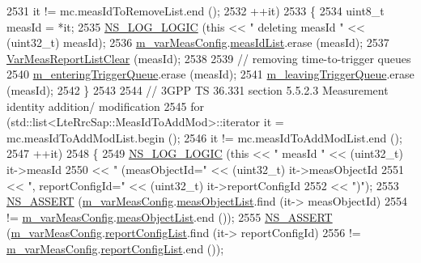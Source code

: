 \begin{DoxyCode}
2531        it !=  mc.measIdToRemoveList.end ();
2532        ++it)
2533     \{
2534       uint8\_t measId = *it;
2535       \hyperlink{group__logging_ga88acd260151caf2db9c0fc84997f45ce}{NS\_LOG\_LOGIC} (\textcolor{keyword}{this} << \textcolor{stringliteral}{" deleting measId "} << (uint32\_t) measId);
2536       \hyperlink{classns3_1_1LteUeRrc_a27a7773eedfdab964d2514d9eeb1c562}{m\_varMeasConfig}.\hyperlink{structns3_1_1LteUeRrc_1_1VarMeasConfig_aa7ad91f943892cec48ffa9a5ae872e8c}{measIdList}.erase (measId);
2537       \hyperlink{classns3_1_1LteUeRrc_aa1a5d20a96dec717502ccf0030921f53}{VarMeasReportListClear} (measId);
2538 
2539       \textcolor{comment}{// removing time-to-trigger queues}
2540       \hyperlink{classns3_1_1LteUeRrc_a06a26d8b08a9c635d7fa6ff8381fff4f}{m\_enteringTriggerQueue}.erase (measId);
2541       \hyperlink{classns3_1_1LteUeRrc_a7984d05cbcc51cd9239a22bd7e400d06}{m\_leavingTriggerQueue}.erase (measId);
2542     \}
2543 
2544   \textcolor{comment}{// 3GPP TS 36.331 section 5.5.2.3 Measurement identity addition/ modification}
2545   \textcolor{keywordflow}{for} (std::list<LteRrcSap::MeasIdToAddMod>::iterator it = mc.measIdToAddModList.begin ();
2546        it !=  mc.measIdToAddModList.end ();
2547        ++it)
2548     \{
2549       \hyperlink{group__logging_ga88acd260151caf2db9c0fc84997f45ce}{NS\_LOG\_LOGIC} (\textcolor{keyword}{this} << \textcolor{stringliteral}{" measId "} << (uint32\_t) it->measId
2550                          << \textcolor{stringliteral}{" (measObjectId="} << (uint32\_t) it->measObjectId
2551                          << \textcolor{stringliteral}{", reportConfigId="} << (uint32\_t) it->reportConfigId
2552                          << \textcolor{stringliteral}{")"});
2553       \hyperlink{assert_8h_a6dccdb0de9b252f60088ce281c49d052}{NS\_ASSERT} (\hyperlink{classns3_1_1LteUeRrc_a27a7773eedfdab964d2514d9eeb1c562}{m\_varMeasConfig}.\hyperlink{structns3_1_1LteUeRrc_1_1VarMeasConfig_a79928885aabfe13a4d88e5d31233fac3}{measObjectList}.find (it->
      measObjectId)
2554                  != \hyperlink{classns3_1_1LteUeRrc_a27a7773eedfdab964d2514d9eeb1c562}{m\_varMeasConfig}.\hyperlink{structns3_1_1LteUeRrc_1_1VarMeasConfig_a79928885aabfe13a4d88e5d31233fac3}{measObjectList}.end ());
2555       \hyperlink{assert_8h_a6dccdb0de9b252f60088ce281c49d052}{NS\_ASSERT} (\hyperlink{classns3_1_1LteUeRrc_a27a7773eedfdab964d2514d9eeb1c562}{m\_varMeasConfig}.\hyperlink{structns3_1_1LteUeRrc_1_1VarMeasConfig_a3ebdd65b8ad3393b5e869599e2a0afff}{reportConfigList}.find (it->
      reportConfigId)
2556                  != \hyperlink{classns3_1_1LteUeRrc_a27a7773eedfdab964d2514d9eeb1c562}{m\_varMeasConfig}.\hyperlink{structns3_1_1LteUeRrc_1_1VarMeasConfig_a3ebdd65b8ad3393b5e869599e2a0afff}{reportConfigList}.end ());

\end{DoxyCode}
